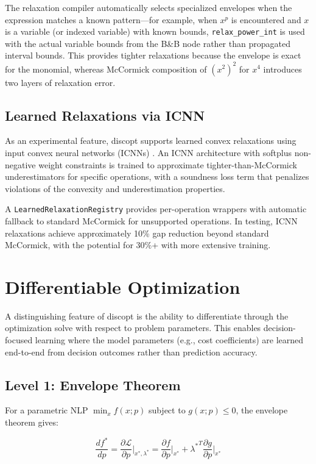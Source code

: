 \documentclass[12pt,preprint]{article}
\begin{document}
The relaxation compiler automatically selects specialized envelopes when the expression matches a known pattern---for example, when $x^p$ is encountered and $x$ is a variable (or indexed variable) with known bounds, \texttt{relax\_power\_int} is used with the actual variable bounds from the B\&B node rather than propagated interval bounds. This provides tighter relaxations because the envelope is exact for the monomial, whereas McCormick composition of $(x^2)^2$ for $x^4$ introduces two layers of relaxation error.

\subsection{Learned Relaxations via ICNN}
\label{org-learned-relaxations-via-icnn}
As an experimental feature, discopt supports learned convex relaxations using input convex neural networks (ICNNs) \cite{Amos2017icnn}. An ICNN architecture with softplus non-negative weight constraints is trained to approximate tighter-than-McCormick underestimators for specific operations, with a soundness loss term that penalizes violations of the convexity and underestimation properties.


A \texttt{LearnedRelaxationRegistry} provides per-operation wrappers with automatic fallback to standard McCormick for unsupported operations. In testing, ICNN relaxations achieve approximately 10\% gap reduction beyond standard McCormick, with the potential for 30\%+ with more extensive training.


\section{Differentiable Optimization}
\label{org-differentiable-optimization}
A distinguishing feature of discopt is the ability to differentiate through the optimization solve with respect to problem parameters. This enables decision-focused learning \cite{Elmachtoub2022} where the model parameters (e.g., cost coefficients) are learned end-to-end from decision outcomes rather than prediction accuracy.

\subsection{Level 1: Envelope Theorem}
\label{org-level-1-envelope-theorem}
For a parametric NLP $\min_x f(x; p)$ subject to $g(x; p) \le 0$, the envelope theorem gives:


\begin{equation}
\frac{d f^*}{d p} = \frac{\partial \mathcal{L}}{\partial p}\bigg|_{x^*, \lambda^*} = \frac{\partial f}{\partial p}\bigg|_{x^*} + {\lambda^*}^T \frac{\partial g}{\partial p}\bigg|_{x^*}
\end{equation}
\end{document}
